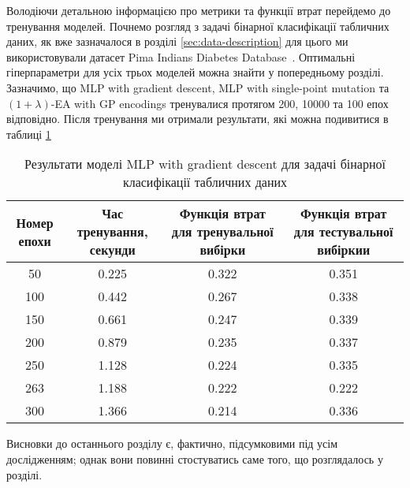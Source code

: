 Володіючи детальною інформацією про метрики та функції втрат перейдемо до тренування моделей. Почнемо розгляд з задачі бінарної класифікації табличних даних, як вже зазначалося в розділі \ref{sec:data-description} для цього ми використовували датасет Pima Indians Diabetes Database~\cite{ct30}. Оптимальні гіперпараметри для усіх трьох моделей можна знайти у попередньому розділі. Зазначимо, що MLP with gradient descent, MLP with single-point mutation та $(1+\lambda)$-EA with GP encodings тренувалися протягом 200, 10000 та 100 епох відповідно. Після тренування ми отримали результати, які можна подивитися в таблиці \ref{mlp_gd_bc_td_results}

\begin{table}[ht]
	\caption{Результати моделі MLP with gradient descent для задачі бінарної класифікації табличних даних}
	\label{mlp_gd_bc_td_results}
	\centering
	\begin{adjustbox}{max width=\textwidth}
		\begin{tabular}{|c|c|c|c|}
			\hline 
			Номер епохи & Час тренування, секунди & Функція втрат для тренувальної вибірки & Функція втрат для тестувальної вибіркии \\
			\hline 
			50 & 0.225 & 0.322 & 0.351 \\
			\hline 
			100 & 0.442 & 0.267 & 0.338 \\
			\hline
			150 & 0.661 & 0.247 & 0.339 \\
			\hline
			200 & 0.879 & 0.235 & 0.337 \\
			\hline
			250 & 1.128 & 0.224 & 0.335 \\
			\hline
			263 & 1.188 & 0.222 & 0.222 \\
			\hline
			300 & 1.366 & 0.214 & 0.336 \\
			\hline
		\end{tabular}
	\end{adjustbox}
\end{table}

\chapconclude{\ref{chap:practice}}

Висновки до останнього розділу є, фактично, підсумковими під усім 
дослідженням; однак вони повинні стостуватись саме того, що розглядалось у 
розділі.